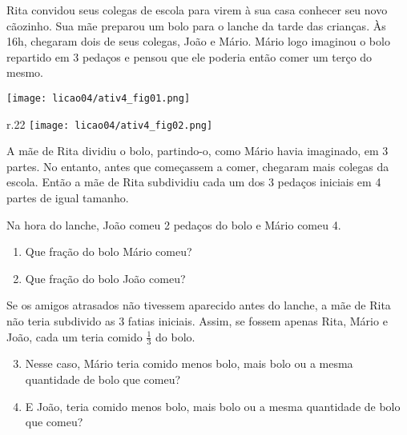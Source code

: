 \begin{atividade}{}\label{chap4-ativ4}


Rita convidou seus colegas de escola para virem à sua casa conhecer seu novo cãozinho. Sua mãe preparou um bolo para o lanche da tarde das crianças. Às 16h, chegaram dois de seus colegas, João e Mário. Mário logo imaginou o bolo repartido em 3 pedaços e pensou que ele poderia então comer um terço do mesmo.

\begin{center}
\texttt{[image: licao04/ativ4\_fig01.png]}
\end{center}

\begin{wrapfigure}[5]{r}{.22\linewidth}
\vspace{-1em}
\texttt{[image: licao04/ativ4\_fig02.png]}
\end{wrapfigure}
A mãe de Rita dividiu o bolo, partindo-o, como Mário havia imaginado, em 3 partes. No entanto, antes que começassem a comer, chegaram mais colegas da escola. Então a mãe de Rita subdividiu cada um dos 3 pedaços iniciais em 4 partes de igual tamanho.





Na hora do lanche, João comeu 2 pedaços do bolo e Mário comeu 4.
\begin{enumerate} %
  \item Que fração do bolo Mário comeu?
  \item Que fração do bolo João comeu?
\end{enumerate} %

Se os amigos atrasados não tivessem aparecido antes do lanche, a mãe de Rita não teria subdivido as 3 fatias iniciais. Assim, se fossem apenas Rita, Mário e João, cada um teria comido $\frac{1}{3}$ do bolo.
\begin{enumerate} %
  \setcounter{enumi}{2}
  \item Nesse caso, Mário teria comido menos bolo, mais bolo ou a mesma quantidade de bolo que comeu?
  \item E João, teria comido menos bolo, mais bolo ou a mesma quantidade de bolo que comeu?
\end{enumerate} %
\end{atividade}


